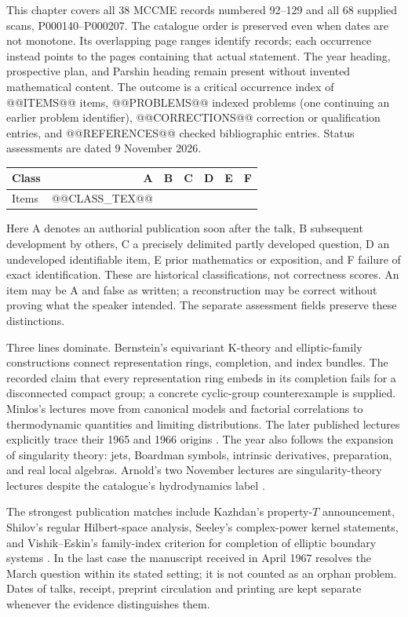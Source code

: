 This chapter covers all 38 MCCME records numbered 92--129 and all 68 supplied scans, P000140--P000207. The catalogue order is preserved even when dates are not monotone. Its overlapping page ranges identify records; each occurrence instead points to the pages containing that actual statement. The year heading, prospective plan, and Parshin heading remain present without invented mathematical content. The outcome is a critical occurrence index of @@ITEMS@@ items, @@PROBLEMS@@ indexed problems (one continuing an earlier problem identifier), @@CORRECTIONS@@ correction or qualification entries, and @@REFERENCES@@ checked bibliographic entries. Status assessments are dated 9 November 2026.

\begin{center}
\begin{tabular}{lrrrrrr}
\toprule
Class & A & B & C & D & E & F\\
\midrule
Items & @@CLASS_TEX@@\\
\bottomrule
\end{tabular}
\end{center}
Here A denotes an authorial publication soon after the talk, B subsequent development by others, C a precisely delimited partly developed question, D an undeveloped identifiable item, E prior mathematics or exposition, and F failure of exact identification. These are historical classifications, not correctness scores. An item may be A and false as written; a reconstruction may be correct without proving what the speaker intended. The separate assessment fields preserve these distinctions.

Three lines dominate. Bernstein’s equivariant K-theory and elliptic-family constructions connect representation rings, completion, and index bundles. The recorded claim that every representation ring embeds in its completion fails for a disconnected compact group; a concrete cyclic-group counterexample is supplied. Minlos’s lectures move from canonical models and factorial correlations to thermodynamic quantities and limiting distributions. The later published lectures explicitly trace their 1965 and 1966 origins \citep[Introduction]{minlos1968lectures}. The year also follows the expansion of singularity theory: jets, Boardman symbols, intrinsic derivatives, preparation, and real local algebras. Arnold’s two November lectures are singularity-theory lectures despite the catalogue’s hydrodynamics label \citep{arnold1968singularities,boardman1967singularities}.

The strongest publication matches include Kazhdan’s property-\(T\) announcement, Shilov’s regular Hilbert-space analysis, Seeley’s complex-power kernel statements, and Vishik--Eskin’s family-index criterion for completion of elliptic boundary systems \citep{kazhdan1967dual,shilov1967hilbert1,seeley1968powers,vishikeskin1967normally}. In the last case the manuscript received in April 1967 resolves the March question within its stated setting; it is not counted as an orphan problem. Dates of talks, receipt, preprint circulation and printing are kept separate whenever the evidence distinguishes them.

